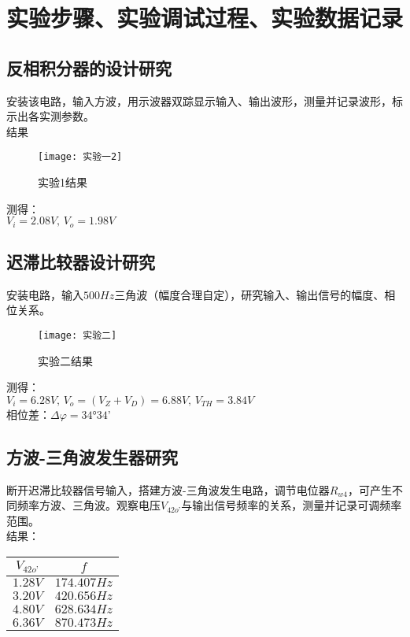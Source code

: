 \documentclass{../source/Experiment}
\begin{document}
    \section{实验步骤、实验调试过程、实验数据记录}
        \subsection{反相积分器的设计研究}
            安装该电路，输入方波，用示波器双踪显示输入、输出波形，测量并记录波形，标示出各实测参数。\\
            结果
            \begin{figure}[h]
                \centering
                \texttt{[image: 实验一2]}
                \caption{实验1结果}
            \end{figure}
            测得：\\
            $V_i = 2.08V,\, V_o = 1.98V$
        \subsection{迟滞比较器设计研究}
            安装电路，输入$500Hz$三角波（幅度合理自定），研究输入、输出信号的幅度、相位关系。
            \begin{figure}[h]
                \centering
                \texttt{[image: 实验二]}
                \caption{实验二结果}
            \end{figure}
            测得：\\
            $V_i = 6.28V,\, V_o =  (V_Z+V_D) = 6.88V,\, V_{TH} = 3.84V$ \\
            相位差：$\Delta \varphi = 34°34’$
        \subsection{方波-三角波发生器研究}
            断开迟滞比较器信号输入，搭建方波-三角波发生电路，调节电位器$R_{w4}$，可产生不同频率方波、三角波。观察电压$V_{42o’}$与输出信号频率的关系，测量并记录可调频率范围。\\
            结果： 
            \begin{table}[h]
                \centering
                \begin{tabular}{|c|c|}
                    \hline
                    $V_{42o’}$ & $f$         \\
                    \hline 
                    $1.28V$    & $174.407Hz$ \\
                    \hline 
                    $3.20V$    & $420.656Hz$ \\
                    \hline 
                    $4.80V$    & $628.634Hz$ \\
                    \hline 
                    $6.36V$    & $870.473Hz$ \\
                    \hline 
                \end{tabular}
            \end{table}
\end{document}
